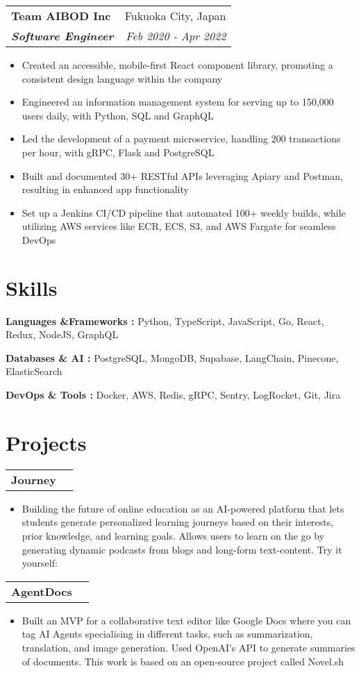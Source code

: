 \documentclass[letterpaper]{article}
\makeatletter
\newcommand{\resumeItemWithoutTitle}[1]{
  \item\small{
    {#1 \vspace{0pt}}
  }
}
\newcommand{\resumeSubheading}[4]{
    \begin{tabular*}{\textwidth}{l@{\extracolsep{\fill}}r}
        \textbf{#1} & #2 \\
        \textbf{\textit{#3}} & \textit{\small #4} \\
    \end{tabular*}\vspace{0pt}
}
\newcommand{\shortSection}[1]{
    \vspace{-6pt}
    \section{#1}
}
\newcommand{\projectHeading}[1]{
  \begin{tabular*}{\textwidth}{l@{\extracolsep{\fill}}r}
        \textbf{#1}
    \end{tabular*}\vspace{0pt}
}
\newcommand*{\skill}[2]{
  \textbf{#1 : }#2 \\
  \vspace{1pt}
}
\newcommand{\resumeItemListStart}{\begin{itemize}}
\newcommand{\resumeItemListEnd}{\end{itemize}}
\makeatother
\begin{document}
\vspace{3pt}
\resumeSubheading
{Team AIBOD Inc}{Fukuoka City, Japan}
{Software Engineer}{Feb 2020 - Apr 2022}
\resumeItemListStart
\resumeItemWithoutTitle{Created an accessible, mobile-first React component library, promoting a consistent design language within the company}
\resumeItemWithoutTitle{Engineered an information management system for serving up to 150,000 users daily,  with Python, SQL and GraphQL}
\resumeItemWithoutTitle{Led the development of a payment microservice, handling 200 transactions per hour, with gRPC, Flask and PostgreSQL}
\resumeItemWithoutTitle{Built and documented 30+ RESTful APIs leveraging Apiary and Postman, resulting in enhanced app functionality}
\resumeItemWithoutTitle{Set up a Jenkins CI/CD pipeline that automated 100+ weekly builds, while utilizing AWS services like ECR, ECS, S3, and AWS Fargate for seamless DevOps}
\resumeItemListEnd



\shortSection{Skills}
\vspace{3pt}
\skill {Languages \&Frameworks}{Python, TypeScript, JavaScript, Go, React, Redux, NodeJS, GraphQL}
\skill {Databases \& AI}{PostgreSQL, MongoDB, Supabase, LangChain, Pinecone, ElasticSearch}
\skill {DevOps \& Tools}{Docker, AWS, Redis, gRPC, Sentry, LogRocket, Git, Jira}


\shortSection{Projects}
\vspace{3pt}
\projectHeading {Journey}
\resumeItemListStart
\resumeItemWithoutTitle{Building the future of online education as an AI-powered platform that lets students generate personalized learning journeys based on their interests, prior knowledge, and learning goals. Allows users to learn on the go by generating dynamic podcasts from blogs and long-form text-content. Try it yourself: \href{https://getjourney.app/home}{\color{blue}{getjourney.app}}}
\resumeItemListEnd


\vspace{3pt}
\projectHeading {AgentDocs}
\resumeItemListStart
\resumeItemWithoutTitle{Built an MVP for a collaborative text editor like Google Docs where you can tag AI Agents specialising in different tasks, such as summarization, translation, and image generation. Used OpenAI's API to generate summaries of documents. This work is based on an open-source project called Novel.sh}
\resumeItemListEnd
\end{document}
